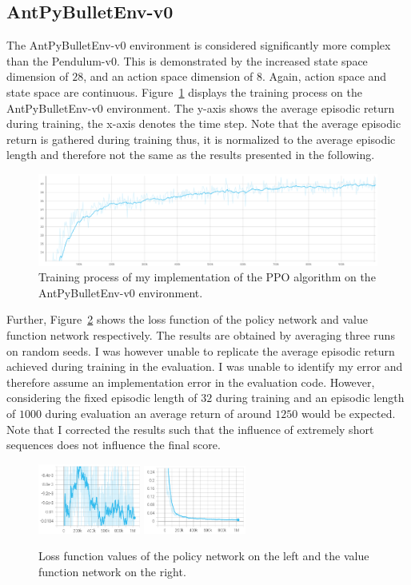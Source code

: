 \subsection{AntPyBulletEnv-v0}\label{subsec:antpybulletenv-v0}
The AntPyBulletEnv-v0 environment is considered significantly more complex than the Pendulum-v0.
This is demonstrated by the increased state space dimension of $28$, and an action space dimension of $8$.
Again, action space and state space are continuous.
Figure~\ref{fig:training_ant} displays the training process on the AntPyBulletEnv-v0 environment.
The y-axis shows the average episodic return during training, the x-axis denotes the time step.
Note that the average episodic return is gathered during training thus, it is normalized to the average episodic
length and therefore not the same as the results presented in the following.
\begin{figure}[t]
    \centering
    \includegraphics[width=\textwidth]{images/presentation/ant_train.png}
    \caption{Training process of my implementation of the PPO algorithm on the AntPyBulletEnv-v0 environment.}
    \label{fig:training_ant}
\end{figure}
Further, Figure~\ref{fig:loss} shows the loss function of the policy network and value function network
respectively.
The results are obtained by averaging three runs on random seeds.
I was however unable to replicate the average episodic return achieved during training in the evaluation.
I was unable to identify my error and therefore assume an implementation error in the evaluation code.
However, considering the fixed episodic length of $32$ during training and an episodic length of $1000$ during evaluation
an average return of around $1250$ would be expected.
Note that I corrected the results such that the influence of extremely short sequences does not influence the final score.
\begin{figure}[t]
    \centering
    \includegraphics[width=0.3\textwidth]{images/presentation/ant_loss_policy.png}
    \includegraphics[width=0.3\textwidth]{images/presentation/ant_loss_value.png}
    \caption{Loss function values of the policy network on the left and the value function network on the right.}
    \label{fig:loss}
\end{figure}


